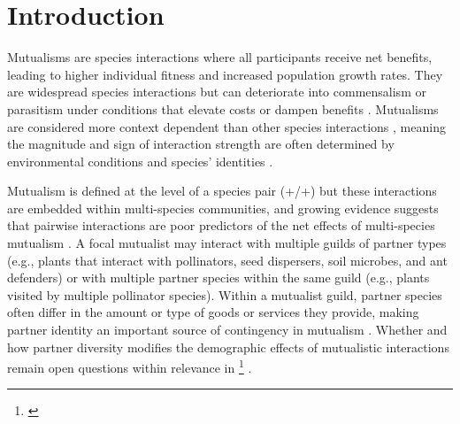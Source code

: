 \documentclass[11pt]{article}
\newcommand{\tom}[2]{{\color{red}{#1}}\footnote{\textit{\color{red}{#2}}}}
\begin{document}
\newpage{}
\section*{Introduction}
Mutualisms are species interactions where all participants receive net benefits, leading to higher individual fitness and increased population growth rates. 
They are widespread species interactions \citep{Bronstein1994,Chamberlain2014,Frederickson2013,Axelrod1981,Leigh2010} but can deteriorate into commensalism or parasitism under conditions that elevate costs or dampen benefits \citep{Rodriguez-Rodriguez2017,Song2020,Mandyam2014,Thrall2007, Bahia2022}.
Mutualisms are considered more context dependent than other species interactions \citep{Chamberlain2014,Frederickson2013}, meaning the magnitude and sign of interaction strength are often determined by environmental conditions and species' identities \citep{Noe1994,Leigh2010}.

Mutualism is defined at the level of a species pair (+/+) but these interactions are embedded within multi-species communities, and growing evidence suggests that pairwise interactions are poor predictors of the net effects of multi-species mutualism \citep{Afkhami2014,Palmer2010,Bascompte2009,Dattilo2014}. 
A focal mutualist may interact with multiple guilds of partner types (e.g., plants that interact with pollinators, seed dispersers, soil microbes, and ant defenders) or with multiple partner species within the same guild (e.g., plants visited by multiple pollinator species). 
Within a mutualist guild, partner species often differ in the amount or type of goods or services they provide, making partner identity an important source of contingency in mutualism \citep{Stanton2003}. 
Whether and how partner diversity modifies the demographic effects of mutualistic interactions remain open questions within relevance in \tom{applied settings}{would be good if you could find another applied example to cite here} \citep{rogers2014}.
\end{document}
